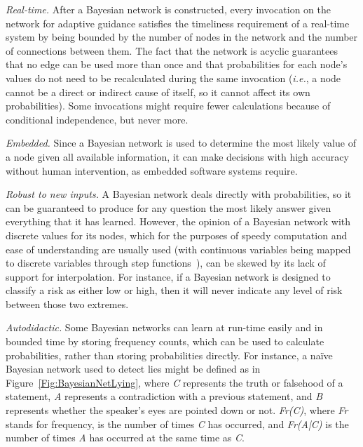 \documentclass[conference]{IEEEtran}
\begin{document}
	\emph{Real-time.} After a Bayesian network is constructed, every invocation on the network for adaptive guidance satisfies the timeliness requirement of a real-time system by being bounded by the number of nodes in the network and the number of connections between them. The fact that the network is acyclic guarantees that no edge can be used more than once and that probabilities for each node's values do not need to be recalculated during the same invocation (\emph{i.e.}, a node cannot be a direct or indirect cause of itself, so it cannot affect its own probabilities). Some invocations might require fewer calculations because of conditional independence, but never more.
	
	\emph{Embedded.} Since a Bayesian network is used to determine the most likely value of a node given all available information, it can make decisions with high accuracy without human intervention, as embedded software systems require.
	
	\emph{Robust to new inputs.} A Bayesian network deals directly with probabilities, so it can be guaranteed to produce for any question the most likely answer given everything that it has learned. However, the opinion of a Bayesian network with discrete values for its nodes, which for the purposes of speedy computation and ease of understanding are usually used (with continuous variables being mapped to discrete variables through step functions~\cite{Friedman:96}), can be skewed by its lack of support for interpolation. For instance, if a Bayesian network is designed to classify a risk as either low or high, then it will never indicate any level of risk between those two extremes.
	
	\emph{Autodidactic.} Some Bayesian networks can learn at run-time easily and in bounded time by storing frequency counts, which can be used to calculate probabilities, rather than storing probabilities directly. 
For instance, a na\"{i}ve Bayesian network used to detect lies might be defined as in Figure~\ref{Fig:BayesianNetLying}, where \emph{C} represents the truth or falsehood of a statement, \emph{A} represents a contradiction with a previous statement, and \emph{B} represents whether the speaker's eyes are pointed down or not. \emph{Fr(C)}, where \emph{Fr} stands for frequency, is the number of times \emph{C} has occurred, and \emph{Fr(A|C)} is the number of times \emph{A} has occurred at the same time as \emph{C}.
\end{document}
